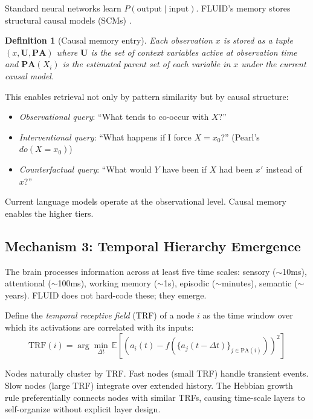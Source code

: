 \documentclass[12pt]{article}
\newtheorem{definition}{Definition}
\begin{document}
Standard neural networks learn $P(\text{output} \mid \text{input})$. FLUID's memory stores structural causal models (SCMs) \cite{pearl2009}.

\begin{definition}[Causal memory entry]
Each observation $x$ is stored as a tuple $(x, \mathbf{U}, \mathbf{PA})$ where $\mathbf{U}$ is the set of context variables active at observation time and $\mathbf{PA}(X_i)$ is the estimated parent set of each variable in $x$ under the current causal model.
\end{definition}

This enables retrieval not only by pattern similarity but by causal structure:
\begin{itemize}
    \item \textit{Observational query}: ``What tends to co-occur with $X$?''
    \item \textit{Interventional query}: ``What happens if I force $X = x_0$?'' (Pearl's $do(X = x_0)$)
    \item \textit{Counterfactual query}: ``What would $Y$ have been if $X$ had been $x'$ instead of $x$?''
\end{itemize}

Current language models operate at the observational level. Causal memory enables the higher tiers.

\subsection{Mechanism 3: Temporal Hierarchy Emergence}

The brain processes information across at least five time scales: sensory ($\sim$10ms), attentional ($\sim$100ms), working memory ($\sim$1s), episodic ($\sim$minutes), semantic ($\sim$years). FLUID does not hard-code these; they emerge.

Define the \textit{temporal receptive field} (TRF) of a node $i$ as the time window over which its activations are correlated with its inputs:
\begin{equation}
\text{TRF}(i) = \arg\min_{\Delta t} \, \mathbb{E}\left[\left(a_i(t) - f\left(\{a_j(t - \Delta t)\}_{j \in \text{PA}(i)}\right)\right)^2\right]
\end{equation}

Nodes naturally cluster by TRF. Fast nodes (small TRF) handle transient events. Slow nodes (large TRF) integrate over extended history. The Hebbian growth rule preferentially connects nodes with similar TRFs, causing time-scale layers to self-organize without explicit layer design.
\end{document}
